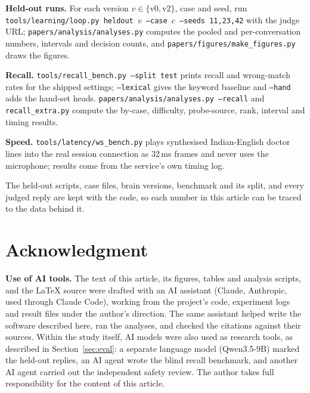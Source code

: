 \textbf{Held-out runs.} For each version $v\in\{\text{v0},\text{v2}\}$, case and seed, run
\texttt{tools/learning/loop.py heldout $v$ --case $c$ --seeds 11,23,42} with the judge URL; \texttt{papers/analysis/analyses.py} computes the
pooled and per-conversation numbers, intervals and decision counts, and \texttt{papers/figures/make\_figures.py} draws the figures.

\textbf{Recall.} \texttt{tools/recall\_bench.py --split test} prints recall and wrong-match rates for the shipped settings; \texttt{--lexical}
gives the keyword baseline and \texttt{--hand} adds the hand-set heads. \texttt{papers/analysis/analyses.py --recall} and
\texttt{recall\_extra.py} compute the by-case, difficulty, probe-source, rank, interval and timing results.

\textbf{Speed.} \texttt{tools/latency/ws\_bench.py} plays synthesised Indian-English doctor lines into the real session connection as 32\,ms
frames and never uses the microphone; results come from the service's own timing log.

The held-out scripts, case files, brain versions, benchmark and its split, and every judged reply are kept with the code, so each number in this
article can be traced to the data behind it.

\section*{Acknowledgment}
\textbf{Use of AI tools.} The text of this article, its figures, tables and analysis scripts, and the \LaTeX{} source were drafted with an AI
assistant (Claude, Anthropic, used through Claude Code), working from the project's code, experiment logs and result files under the author's
direction. The same assistant helped write the software described here, ran the analyses, and checked the citations against their sources.
Within the study itself, AI models were also used as research tools, as described in Section~\ref{sec:eval}: a separate language model
(Qwen3.5-9B) marked the held-out replies, an AI agent wrote the blind recall benchmark, and another AI agent carried out the independent safety
review. The author takes full responsibility for the content of this article.






